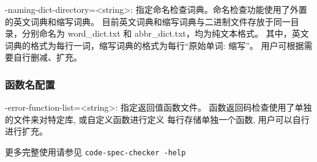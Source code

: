 \qquad -naming-dict-directory=<string>:  
指定命名检查词典。命名检查功能使用了外置的英文词典和缩写词典。
目前英文词典和缩写词典与二进制文件存放于同一目录，分别命名为 word\_dict.txt 和 abbr\_dict.txt，均为纯文本格式。
其中，英文词典的格式为每行一词，缩写词典的格式为每行“原始单词: 缩写”。
用户可根据需要自行删减、扩充。

\subsubsection{函数名配置}

\qquad -error-function-list=<string>: 
指定返回值函数文件。
函数返回码检查使用了单独的文件来对特定库, 或自定义函数进行定义
每行存储单独一个函数, 用户可以自行进行扩充。\newline

更多完整使用请参见 \quad \verb|code-spec-checker -help|
